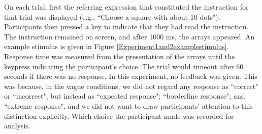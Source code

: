 On each trial, first the referring expression that constituted the instruction for that trial was displayed (e.g., ``Choose a square with about 10 dots"). Participants then pressed a key to indicate that they had read the instruction. The instruction remained on screen, and after 1000 ms, the arrays appeared. An example stimulus is given in Figure \ref{Experiment1and2examplestimulus}. Response time was measured from the presentation of the arrays until the keypress indicating the participant's choice. The trial would timeout after 60 seconds if there was no response. In this experiment, no feedback was given. This was because, in the vague conditions, we did not regard any response as ``correct" or ``incorrect", but instead as ``expected response"; ``borderline response"; and ``extreme response", and we did not want to draw participants' attention to this distinction explicitly. Which choice the participant made was recorded for analysis.

